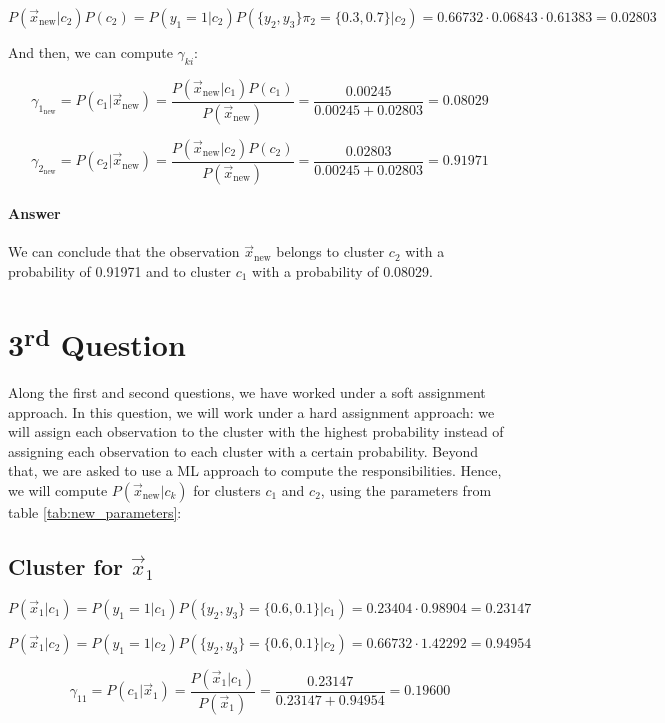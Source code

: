 \documentclass{article}
\begin{document}
\[ P(\vec{x}_{\text{new}} | c_2)P(c_2) = P(y_1 = 1 | c_2) P(\{y_2, y_3\} \pi_2  = \{0.3, 0.7\} | c_2) = 0.66732 \cdot 0.06843 \cdot 0.61383 = 0.02803 \]

And then, we can compute $\gamma_{ki}$:

\[ \gamma_{1_{\text{new}}} = P(c_1| \vec{x}_{\text{new}}) = \frac{P(\vec{x}_{\text{new}} | c_1) P(c_1)}{P(\vec{x}_{\text{new}})} = \frac{0.00245}{0.00245 + 0.02803} = 0.08029 \]

\[ \gamma_{2_{\text{new}}} = P(c_2| \vec{x}_{\text{new}}) = \frac{P(\vec{x}_{\text{new}} | c_2) P(c_2)}{P(\vec{x}_{\text{new}})} = \frac{0.02803}{0.00245 + 0.02803} = 0.91971 \]

\paragraph{Answer} We can conclude that the observation $\vec{x}_{\text{new}}$ belongs to cluster $c_2$ with a probability of 0.91971 and to cluster $c_1$ with a probability of 0.08029.

\newpage

\section*{3\textsuperscript{rd} Question}

Along the first and second questions, we have worked under a soft assignment approach. In this question, we will work under a hard assignment approach: we will assign each observation to the cluster with the highest probability instead of assigning each observation to each cluster with a certain probability.
Beyond that, we are asked to use a ML approach to compute the responsibilities. Hence, we will compute $P(\vec{x}_{\text{new}} | c_k)$ for clusters $c_1$ and $c_2$, using the parameters from table \ref{tab:new_parameters}:

\subsection*{Cluster for $\vec{x}_1$}

\[ P(\vec{x}_1 | c_1) = P(y_1 = 1 | c_1) P(\{y_2, y_3\}  = \{0.6, 0.1\} | c_1) = 0.23404 \cdot 0.98904 = 0.23147 \]

\[ P(\vec{x}_1 | c_2) = P(y_1 = 1 | c_2) P(\{y_2, y_3\}  = \{0.6, 0.1\} | c_2) = 0.66732 \cdot 1.42292 = 0.94954 \]

\[ \gamma_{11} = P(c_1| \vec{x}_1) = \frac{P(\vec{x}_1 | c_1)}{P(\vec{x}_1)} = \frac{0.23147}{0.23147 + 0.94954} = 0.19600 \]
\end{document}
